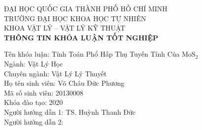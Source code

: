 \documentclass[12pt,english,a4paper]{article}
\begin{document}
	\begin{center}
		{\large {ĐẠI HỌC QUỐC GIA THÀNH PHỐ HỒ CHÍ MINH}\\ {TRƯỜNG ĐẠI HỌC KHOA HỌC TỰ NHIÊN}\\
			{ {KHOA VẬT LÝ – VẬT LÝ KỸ THUẬT}}}\\[1cm]
		{\textbf{THÔNG TIN KHÓA LUẬN TỐT NGHIỆP}}
	\end{center}
	\quad Tên khóa luận: Tính Toán Phổ Hấp Thụ Tuyến Tính Của  $\mathrm{MoS}_2$\\\null
	\quad Ngành: Vật Lý Học\\\null
	\quad Chuyên ngành: Vật Lý Lý Thuyết\\\null
	\quad Họ tên sinh viên: Võ Châu Đức Phương\\\null
	\quad Mã số sinh viên: 20130008\\\null
	\quad Khóa đào tạo: 2020\\\null
	\quad Người hướng dẫn 1: TS. Huỳnh Thanh Đức \\\null
	\quad Người hướng dẫn 2:\\\null
\end{document}
